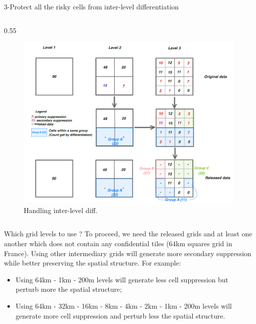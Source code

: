 \documentclass[final,xcolor={dvipsnames,svgnames,table}]{beamer}
\newlength{\colwidth}
\begin{document}
\begin{frame}[fragile,t]
\begin{columns}[t]
\begin{column}{\colwidth}
\begin{block}{3-Protect all the risky cells from inter-level differentiation}
\begin{columns}
        \begin{column}{0.55\colwidth}
            \begin{figure}
                \centering
                \includegraphics[scale=0.7]{Images/grille_creu_proc_all.png}
                \caption{Handling inter-level diff.}
                \label{fig:my_label}
            \end{figure}
        \end{column}
    \end{columns}

    \vspace{0.5cm}
    \begin{problock}{Which grid levels to use ?}
    To proceed, we need the released grids and at least one another which does not contain any confidential tiles (64km squares grid in France). Using other intermediary grids will generate more secondary suppression while better preserving the spatial structure. For example:
    \begin{itemize}
        \item Using 64km - 1km - 200m levels will generate less cell suppression but perturb more the spatial structure;
        \item Using 64km - 32km - 16km - 8km - 4km - 2km - 1km - 200m levels will generate more cell suppression and perturb less the spatial structure.
    \end{itemize}

    \end{problock}
    
    \end{block}




\end{column}
\end{columns}
\end{frame}
\end{document}

